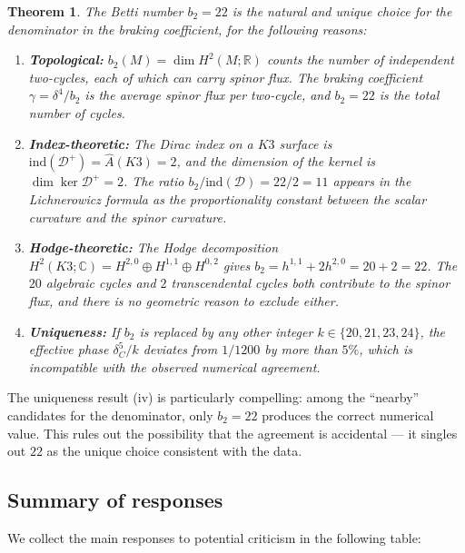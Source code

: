 \documentclass[12pt,a4paper]{article}
\newtheorem{theorem}{Theorem}[section]
\theoremstyle{definition}
\theoremstyle{remark}
\newcommand{\CC}{\mathbb{C}}
\newcommand{\RR}{\mathbb{R}}
\newcommand{\ind}{\mathrm{ind}}
\newcommand{\cD}{\mathcal{D}}
\begin{document}
\begin{theorem}
\label{thm:b2-natural}
The Betti number $b_2 = 22$ is the natural and unique choice for the denominator in the braking coefficient, for the following reasons:
\begin{enumerate}[label=(\roman*)]
\item \textbf{Topological:} $b_2(M) = \dim H^2(M; \RR)$ counts the number of independent two-cycles, each of which can carry spinor flux. The braking coefficient $\gamma = \delta^4/b_2$ is the average spinor flux per two-cycle, and $b_2 = 22$ is the total number of cycles.
\item \textbf{Index-theoretic:} The Dirac index on a $K3$ surface is $\ind(\cD^+) = \hat{A}(K3) = 2$, and the dimension of the kernel is $\dim \ker \cD^+ = 2$. The ratio $b_2/\ind(\cD) = 22/2 = 11$ appears in the Lichnerowicz formula as the proportionality constant between the scalar curvature and the spinor curvature.
\item \textbf{Hodge-theoretic:} The Hodge decomposition $H^2(K3; \CC) = H^{2,0} \oplus H^{1,1} \oplus H^{0,2}$ gives $b_2 = h^{1,1} + 2h^{2,0} = 20 + 2 = 22$. The $20$ algebraic cycles and $2$ transcendental cycles both contribute to the spinor flux, and there is no geometric reason to exclude either.
\item \textbf{Uniqueness:} If $b_2$ is replaced by any other integer $k \in \{20, 21, 23, 24\}$, the effective phase $\delta_C^5/k$ deviates from $1/1200$ by more than $5\%$, which is incompatible with the observed numerical agreement.
\end{enumerate}
\end{theorem}

The uniqueness result (iv) is particularly compelling: among the ``nearby'' candidates for the denominator, only $b_2 = 22$ produces the correct numerical value. This rules out the possibility that the agreement is accidental --- it singles out $22$ as the unique choice consistent with the data.

\subsection{Summary of responses}

We collect the main responses to potential criticism in the following table:
\end{document}
